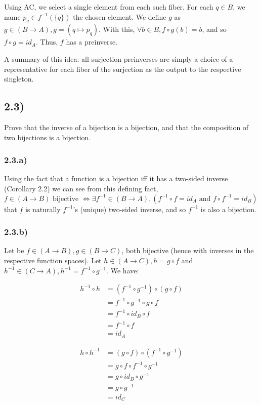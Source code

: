 \documentclass[12pt, letterpaper, twoside]{report}
\begin{document}
Using AC, we select a single element from each such fiber. For each $q \in B$, we name $p_q \in f^{-1}(\{q\})$ the chosen element. We define $g$ as $g \in (B \to A), g = (q \mapsto p_q)$. With this, $\forall b \in B, f \circ g (b) = b$, and so $f \circ g = id_A$. Thus, $f$ has a preinverse.

A summary of this idea: all surjection preinverses are simply a choice of a representative for each fiber of the surjection as the output to the respective singleton.



\subsection*{2.3)}

Prove that the inverse of a bijection is a bijection, and that the composition of two bijections is a bijection.

\subsubsection*{2.3.a)} Using the fact that a function is a bijection iff it has a two-sided inverse (Corollary 2.2) we can see from this defining fact, $f \in (A \to B) \text{ bijective } \Leftrightarrow \exists f^{-1} \in (B \to A), (f^{-1} \circ f = id_A \text { and } f \circ f^{-1} = id_B)$ that $f$ is naturally $f^{-1}$'s (unique) two-sided inverse, and so $f^{-1}$ is also a bijection.

\subsubsection*{2.3.b)} Let be $f \in (A \to B), g \in (B \to C)$, both bijective (hence with inverses in the respective function spaces). Let $h \in (A \to C), h = g \circ f$ and $h^{-1} \in (C \to A), h^{-1} = f^{-1} \circ g^{-1}$. We have:

$$
\begin{aligned}
h^{-1} \circ h &= (f^{-1} \circ g^{-1}) \circ (g \circ f) \\
               &=  f^{-1} \circ g^{-1}  \circ  g \circ f  \\
               &=  f^{-1} \circ          id_B    \circ f  \\
               &=  f^{-1} \circ                        f  \\
               &=  id_A
\end{aligned}
$$

$$
\begin{aligned}
h \circ h^{-1} &= (g \circ f) \circ (f^{-1} \circ g^{-1}) \\
               &=  g \circ f  \circ  f^{-1} \circ g^{-1}  \\
               &=  g \circ     id_B         \circ g^{-1}  \\
               &=  g \circ                        g^{-1}  \\
               &=  id_C
\end{aligned}
$$
\end{document}
